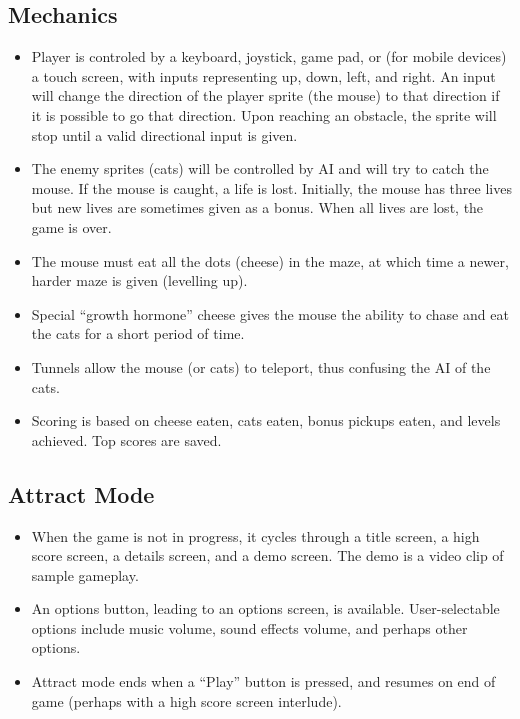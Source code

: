 \documentclass[12pt]{amsbook}
\theoremstyle{definition}
\theoremstyle{remark}
\numberwithin{figure}{chapter}
\numberwithin{table}{chapter}
\numberwithin{section}{chapter}
\numberwithin{equation}{section}
\begin{document}
\subsection{Mechanics}
\begin{itemize}
\item Player is controled by a keyboard, joystick, game pad, or (for mobile devices) a touch screen, with inputs representing up, down, left, and right.  An input will change the direction of the player sprite (the mouse) to that direction if it is possible to go that direction.  Upon reaching an obstacle, the sprite will stop until a valid directional input is given.

\item The enemy sprites (cats) will be controlled by AI and will try to catch the mouse.  If the mouse is caught, a life is lost.  Initially, the mouse has three lives but new lives are sometimes given as a bonus.  When all lives are lost, the game is over.

\item The mouse must eat all the dots (cheese) in the maze, at which time a newer, harder maze is given (levelling up).  

\item Special ``growth hormone'' cheese gives the mouse the ability to chase and eat the cats for a short period of time.

\item Tunnels allow the mouse (or cats) to teleport, thus confusing the AI of the cats.  

\item Scoring is based on cheese eaten, cats eaten, bonus pickups eaten, and levels achieved.  Top scores are saved.
\end{itemize}

\subsection{Attract Mode}
\begin{itemize}
\item When the game is not in progress, it cycles through a title screen, a high score screen, a details screen, and a demo screen.  The demo is a video clip of sample gameplay.

\item An options button, leading to an options screen, is available.  User-selectable options include music volume, sound effects volume, and perhaps other options.

\item Attract mode ends when a ``Play'' button is pressed, and resumes on end of game (perhaps with a high score screen interlude).
\end{itemize}
\end{document}
